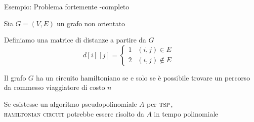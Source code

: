 \begin{frame}{Esempio: Problema fortemente \NP-completo}

\vspace{-9pt}
\BIL
\item Sia $G=(V,E)$ un grafo non orientato 
\item Definiamo una matrice di distanze a partire da $G$
\medskip
\[
  d[i][j] = \begin{cases}
    1 & (i,j) \in E \\
    2 & (i,j) \notin E
  \end{cases}
\]    

\item Il grafo $G$ ha un circuito hamiltoniano se e solo se è possibile
trovare un percorso da commesso viaggiatore di costo $n$
\item Se esistesse un algoritmo pseudopolinomiale $A$ per $\textsc{tsp}$, \\
\textsc{hamiltonian circuit} potrebbe essere risolto da $A$ in tempo polinomiale
\EIL
\end{frame}


